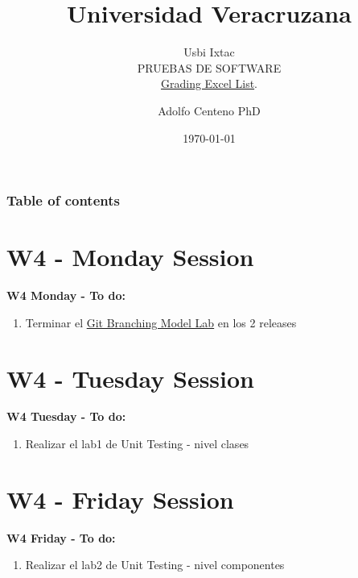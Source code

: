 \documentclass{beamer}
\begin{document}
\title{Universidad Veracruzana}  
\subtitle{Usbi Ixtac\\PRUEBAS DE SOFTWARE\\\href{https://drive.google.com/file/d/1x-8DA-Xe7fQfKMPQY9XWx86y6o0Z-NRR/view?usp=sharing}{Grading Excel List}.
}
\author{Adolfo Centeno PhD}
\date{\today} 


\begin{frame}
\titlepage
\end{frame}

\begin{frame}\frametitle{Table of contents}
\tableofcontents
\end{frame} 


\section{W4 - Monday Session  }

\begin{frame}

\textbf{W4 Monday - To do:}

\begin{enumerate}
\item
	Terminar el 	\href{https://github.com/adsoftsito/tdd/blob/master/w3/gitbranchinglab.pdf}{Git Branching Model Lab} 
 en los 2 releases 
	

\end{enumerate} 

\end{frame}


\section{W4 - Tuesday Session }

\begin{frame}

\textbf{W4 Tuesday - To do:}

\begin{enumerate}
\item
	Realizar el lab1 de Unit Testing - nivel clases

\end{enumerate} 

\end{frame}


\section{W4 - Friday Session }

\begin{frame}

\textbf{W4 Friday - To do:}

\begin{enumerate}
\item
	Realizar el lab2 de Unit Testing - nivel componentes
	
\end{enumerate} 


\end{frame}
\end{document}
